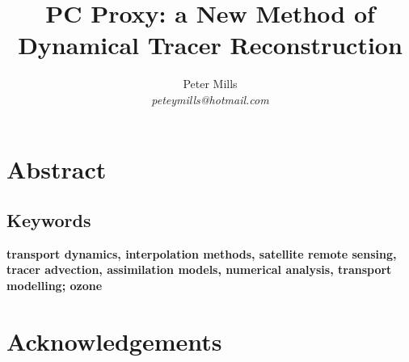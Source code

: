 \documentclass{article}
\begin{document}
\newcommand{\vect}[1]{\ensuremath{\vec #1}}
\newcommand{\italics}[1]{{\it #1}}

\title{PC Proxy: a New Method of Dynamical Tracer Reconstruction}

\author{Peter Mills\\\textit{peteymills@hotmail.com}}

\maketitle

\pagestyle{myheadings}

\section*{Abstract}



\subsection*{Keywords}
\textbf{transport dynamics, interpolation methods, satellite remote sensing, tracer advection, assimilation models, numerical analysis, transport modelling; ozone}

\pagebreak

\tableofcontents



\section{Acknowledgements}






\appendix


\end{document}
